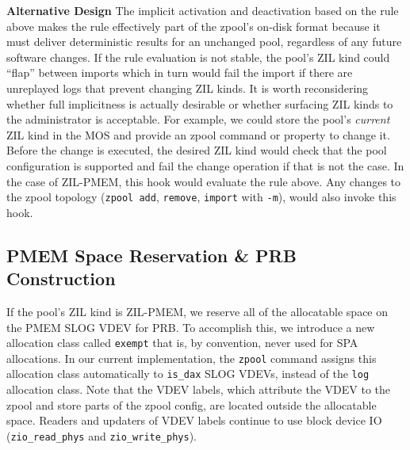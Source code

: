 \documentclass[12pt,a4paper,twoside]{book}
\begin{document}
\textbf{Alternative Design}
The implicit activation and deactivation based on the rule above makes the rule effectively part of the zpool's on-disk format because it must deliver deterministic results for an unchanged pool, regardless of any future software changes.
If the rule evaluation is not stable, the pool's ZIL kind could ``flap'' between imports which in turn would fail the import if there are unreplayed logs that prevent changing ZIL kinds.
It is worth reconsidering whether full implicitness is actually desirable or whether surfacing ZIL kinds to the administrator is acceptable.
For example, we could store the pool's \textit{current} ZIL kind in the MOS and provide an zpool command or property to change it.
Before the change is executed, the desired ZIL kind would check that the pool configuration is supported and fail the change operation if that is not the case.
In the case of ZIL-PMEM, this hook would evaluate the rule above.
Any changes to the zpool topology (\lstinline{zpool add}, \lstinline{remove}, \lstinline{import} with \lstinline{-m}), would also invoke this hook.

\subsection{PMEM Space Reservation \& PRB Construction}\label{sec:zilpmemzilkind:spacereservation}

If the pool's ZIL kind is ZIL-PMEM, we reserve all of the allocatable space on the PMEM SLOG VDEV for PRB.
To accomplish this, we introduce a new allocation class called \lstinline{exempt} that is, by convention, never used for SPA allocations.
In our current implementation, the \lstinline{zpool} command assigns this allocation class automatically to \lstinline{is_dax} SLOG VDEVs, instead of the \lstinline{log} allocation class.
Note that the VDEV labels, which attribute the VDEV to the zpool and store parts of the zpool config, are located outside the allocatable space.
Readers and updaters of VDEV labels continue to use block device IO (\lstinline{zio_read_phys} and \lstinline{zio_write_phys}).
\end{document}
